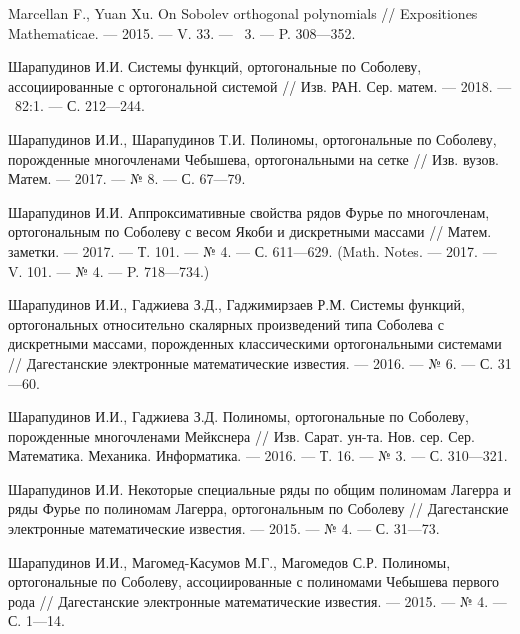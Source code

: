 \begin{thebibliography}{111}

Marcellan F., Yuan Xu. On Sobolev orthogonal polynomials // Expositiones Mathematicae. --- 2015. --- V. 33. --- \No\ 3. --- P. 308---352.



{Шарапудинов И.И.} Системы функций, ортогональные по Соболеву, ассоциированные с ортогональной системой // Изв. РАН. Сер. матем. --- 2018. --- \No\  82:1. --- С. 212---244.



Шарапудинов И.И., Шарапудинов Т.И. Полиномы, ортогональные по Соболеву, порожденные многочленами Чебышева, ортогональными на сетке // Изв. вузов. Матем. --- 2017. --- № 8. --- С. 67---79.



Шарапудинов И.И. Аппроксимативные свойства рядов Фурье по многочленам, ортогональным по Соболеву с весом Якоби и дискретными массами // Матем. заметки. --- 2017. --- Т. 101. --- № 4. --- С. 611---629. (Math. Notes. --- 2017. --- V. 101. --- № 4. --- P. 718---734.)



Шарапудинов И.И., Гаджиева З.Д., Гаджимирзаев Р.М. Системы функций, ортогональных относительно скалярных произведений типа Соболева с дискретными массами, порожденных классическими ортогональными системами // Дагестанские электронные математические известия. --- 2016. --- № 6. --- С. 31---60.



Шарапудинов И.И., Гаджиева З.Д. Полиномы, ортогональные по Соболеву, порожденные многочленами Мейкснера // Изв. Сарат. ун-та. Нов. сер. Сер. Математика. Механика. Информатика. --- 2016. --- Т. 16. --- № 3. --- С. 310---321.



Шарапудинов И.И. Некоторые специальные ряды по общим полиномам Лагерра и ряды Фурье по полиномам Лагерра, ортогональным по Соболеву // Дагестанские электронные математические известия. --- 2015. --- № 4. --- С. 31---73.



Шарапудинов И.И., Магомед-Касумов М.Г., Магомедов С.Р. Полиномы, ортогональные по Соболеву, ассоциированные с полиномами Чебышева первого рода // Дагестанские электронные математические известия. --- 2015. --- № 4. --- С. 1---14.




\end{thebibliography}
